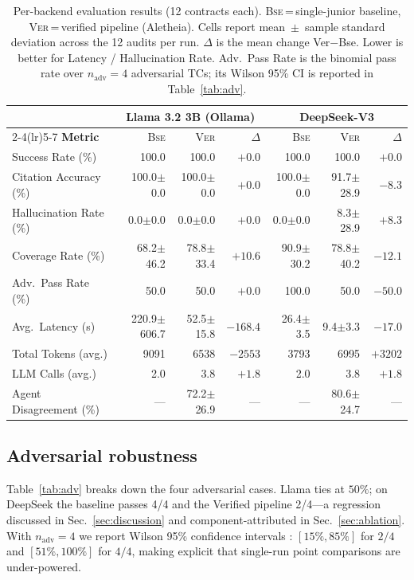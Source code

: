 \documentclass{article}
\begin{document}
\begin{table}[t]
\centering
\caption{Per-backend evaluation results (12 contracts each).
\textsc{Bse}\,=\,single-junior baseline, \textsc{Ver}\,=\,verified
pipeline (Aletheia). Cells report mean~$\pm$~sample standard deviation
across the 12 audits per run. $\Delta$ is the mean change Ver$-$Bse.
Lower is better for Latency / Hallucination Rate. Adv.\ Pass Rate is
the binomial pass rate over $n_{\text{adv}}{=}4$ adversarial TCs;
its Wilson 95\% CI is reported in Table~\ref{tab:adv}.}
\label{tab:per_backend}
\small
\begin{tabular}{lrrrrrr}
\toprule
& \multicolumn{3}{c}{\textbf{Llama 3.2 3B (Ollama)}} & \multicolumn{3}{c}{\textbf{DeepSeek-V3}} \\
\cmidrule(lr){2-4}\cmidrule(lr){5-7}
\textbf{Metric} & \textsc{Bse} & \textsc{Ver} & $\Delta$
                & \textsc{Bse} & \textsc{Ver} & $\Delta$ \\
\midrule
Success Rate (\%)        & 100.0 & 100.0 &  $+0.0$ & 100.0 & 100.0 & $+0.0$  \\
Citation Accuracy (\%)   & 100.0$\pm$0.0 & 100.0$\pm$0.0 &  $+0.0$
                         & 100.0$\pm$0.0 & 91.7$\pm$28.9 & $-8.3$  \\
Hallucination Rate (\%)  & 0.0$\pm$0.0   & 0.0$\pm$0.0   &  $+0.0$
                         & 0.0$\pm$0.0   & 8.3$\pm$28.9  & $+8.3$  \\
Coverage Rate (\%)       & 68.2$\pm$46.2 & 78.8$\pm$33.4 & $+10.6$
                         & 90.9$\pm$30.2 & 78.8$\pm$40.2 & $-12.1$ \\
Adv.\ Pass Rate (\%)     & 50.0  & 50.0  &  $+0.0$ & 100.0 & 50.0  & $-50.0$ \\
Avg.\ Latency (s)        & 220.9$\pm$606.7 & 52.5$\pm$15.8 &$-168.4$
                         & 26.4$\pm$3.5    & 9.4$\pm$3.3   & $-17.0$ \\
Total Tokens (avg.)      & 9091  & 6538  & $-2553$ & 3793  & 6995  & $+3202$ \\
LLM Calls (avg.)         & 2.0   & 3.8   &  $+1.8$ & 2.0   & 3.8   & $+1.8$  \\
Agent Disagreement (\%)  & ---   & 72.2$\pm$26.9  &     --- & ---   & 80.6$\pm$24.7  & ---     \\
\bottomrule
\end{tabular}
\end{table}

\subsection{Adversarial robustness}
Table~\ref{tab:adv} breaks down the four adversarial cases.
Llama ties at $50\%$; on DeepSeek the baseline passes 4/4 and the
Verified pipeline 2/4---a regression discussed in
Sec.~\ref{sec:discussion} and component-attributed in
Sec.~\ref{sec:ablation}. With $n_{\text{adv}}{=}4$ we report Wilson
95\% confidence intervals \cite{wilson1927ci}: $[15\%,85\%]$ for
$2/4$ and $[51\%,100\%]$ for $4/4$, making explicit that single-run
point comparisons are under-powered.
\end{document}
